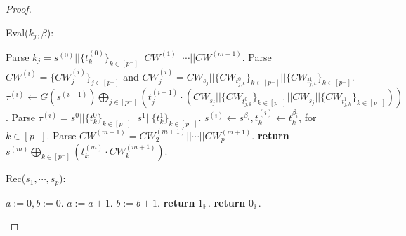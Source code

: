 \documentclass[11pt]{article}
\newcommand{\Eval}{\textsf{Eval}}
\newcommand{\Rec}{\textsf{Rec}}
\begin{document}
\begin{proof}
\begin{algorithm}
\vspace{10px}
\Eval($k_j, \beta$):
\begin{algorithmic}[1]
\State Parse $k_j = s^{(0)}||\{t_k^{(0)}\}_{k \in [p^-]}||CW^{(1)}||\cdots||CW^{(m+1)}$.
\State Parse $CW^{(i)} = \{CW^{(i)}_j\}_{j \in [p^-]}$ and $CW^{(i)}_j = CW_{s_j}||\{CW_{t_{j,k}^0}\}_{k \in [p^-]}||\{CW_{t_{j,k}^1}\}_{k \in [p^-]} $.
\State $\tau^{(i)} \leftarrow G(s^{(i-1)}) \bigoplus_{j \in [p^-]} \left(t^{(i-1)}_j \cdot \left(CW_{s_j}||\{CW_{t_{j,k}^0}\}_{k \in [p^-]}||CW_{s_j}||\{CW_{t_{j,k}^1}\}_{k \in [p^-]}\right)\right)$.
\State Parse $\tau^{(i)} = s^0||\{t_{k}^0\}_{k \in [p^-]} ||s^1||\{t_k^1\}_{k \in [p^-]}$.
\State $s^{(i)} \leftarrow s^{\beta_i}, t_k^{(i)} \leftarrow t_k^{\beta_i}$, for $k \in [p^-]$.
\EndFor
\State Parse $CW^{(m+1)} = CW^{(m+1)}_2 || \cdots || CW^{(m+1)}_p$.
\State \textbf{return} $s^{(m)} \bigoplus_{k \in [p^-]} \left(t_k^{(m)} \cdot CW^{(m+1)}_k \right)$.
\end{algorithmic}

\vspace{10px}
\Rec($s_1, \cdots, s_p$):
\begin{algorithmic}[1]
\State $a := 0, b := 0$.
\State $a := a + 1$.
\Else
\State $b := b + 1$.
\EndIf
\EndFor
{}
\State \textbf{return} $1_\mathbb{F}$.
\Else
\State \textbf{return} $0_\mathbb{F}$.
\EndIf
\end{algorithmic}
\end{algorithm}



\end{proof}
\end{document}
